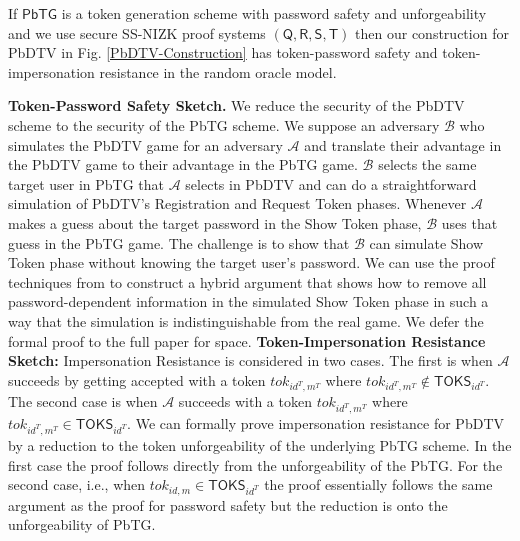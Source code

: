 \documentclass[conference]{IEEEtran}
\newcommand{\cA}{\mathcal{A}}
\newcommand{\cB}{\mathcal{B}}
\newcommand{\uid}{id}
\begin{document}
 If $\mathsf{PbTG}$ is a token generation scheme with password safety and unforgeability and we use secure SS-NIZK proof systems $(\mathsf{Q,R,S,T})$ \cite{T-PAKE-Mackenzie} then our construction for PbDTV in Fig. \ref{PbDTV-Construction} has token-password safety and token-impersonation resistance in the random oracle model.

\noindent
{\bf Token-Password Safety Sketch.} We reduce the security of the PbDTV scheme to the security of the PbTG scheme. We suppose an adversary $\cB$ who simulates the PbDTV game for an adversary $\cA$ and translate their advantage in the PbDTV game to their advantage in the PbTG game. $\cB$ selects the same target user in PbTG that $\cA$ selects in PbDTV and can do a straightforward simulation of PbDTV's Registration and Request Token phases. Whenever $\cA$ makes a guess about the target password in the Show Token phase, $\cB$ uses that guess in the PbTG game. The challenge is to show that $\cB$ can simulate Show Token phase without knowing the target user's password. We can use the proof techniques from \cite{T-PAKE-Mackenzie} to construct a hybrid argument that shows how to remove all password-dependent information in the simulated Show Token phase in such a way that the simulation is indistinguishable from the real game. We defer the formal proof to the full paper for space.
{\bf Token-Impersonation Resistance Sketch:} Impersonation Resistance is considered in two cases. The first is when $\cA$ succeeds by getting accepted with a token $tok_{\uid^{T},m^{T}}$ where $tok_{\uid^{T},m^{T}} \notin \mathsf{TOKS}_{\uid^{T}}$. The second case is when $\cA$ succeeds with a token $tok_{\uid^{T},m^{T}}$ where $tok_{\uid^{T},m^{T}} \in \mathsf{TOKS}_{\uid^{T}}$. We can formally prove impersonation resistance for PbDTV by a reduction to the token unforgeability of the underlying PbTG scheme.
 In the first case the proof follows directly from the unforgeability of the PbTG. For the second case, i.e., when $tok_{\uid,m} \in \mathsf{TOKS}_{\uid^{T}}$ the proof essentially follows the same argument as the proof for password safety but the reduction is onto the unforgeability of PbTG. 
\end{document}
